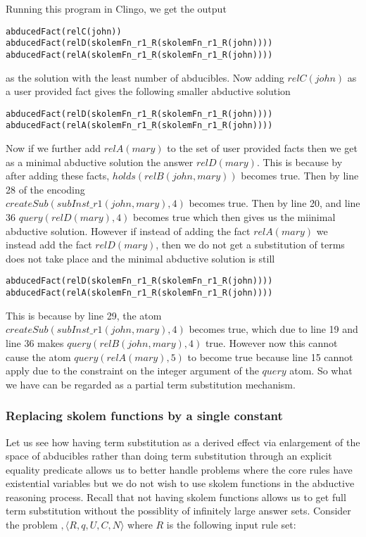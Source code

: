 Running this program in Clingo, we get the output 
\begin{lstlisting}[frame=none]
abducedFact(relC(john))
abducedFact(relD(skolemFn_r1_R(skolemFn_r1_R(john))))
abducedFact(relA(skolemFn_r1_R(skolemFn_r1_R(john))))    
\end{lstlisting}
as the solution with the least number of abducibles.
Now adding $relC(john)$ as a user provided fact gives the following smaller abductive solution
\begin{lstlisting}[frame=none]
abducedFact(relD(skolemFn_r1_R(skolemFn_r1_R(john))))
abducedFact(relA(skolemFn_r1_R(skolemFn_r1_R(john))))    
\end{lstlisting}
Now if we further add $relA(mary)$ to the set of user provided facts then we
get as a minimal abductive solution the answer $relD(mary)$. This is because
by after adding these facts, $holds(relB(john,mary))$ becomes true. Then by
line 28 of the encoding\\
$createSub(subInst\_r1(john,mary),4)$ becomes
true. Then by line 20, and line 36 $query(relD(mary),4)$ becomes true which
then gives us the miinimal abductive solution. However if instead of adding
the fact $relA(mary)$ we instead add the fact $relD(mary)$, then we do not get
a  substitution of terms does not take place and the minimal abductive
solution is still
\begin{lstlisting}[frame=none]
abducedFact(relD(skolemFn_r1_R(skolemFn_r1_R(john))))
abducedFact(relA(skolemFn_r1_R(skolemFn_r1_R(john))))    
\end{lstlisting} 
This is because by line 29, the atom\\ $createSub(subInst\_r1(john,mary),4)$ becomes true,
which due to line 19 and line 36 makes $query(relB(john,mary),4)$
true. However now this cannot cause the atom $query(relA(mary),5)$ to become
true because line 15 cannot apply due to the constraint on the integer
argument of the $query$ atom. So what we have can be regarded as a partial
term substitution mechanism.


\subsubsection{Replacing skolem functions by a single constant}

Let us see how having term substitution as a derived effect via enlargement of
the space of abducibles rather than doing term substitution through an
explicit equality predicate allows us to better handle problems where the core
rules have existential variables but we do not wish to use skolem functions in
the abductive reasoning process. Recall that not having skolem functions
allows us to get full term substitution without the possiblity of infinitely
large answer sets. Consider the problem $,\langle R,q,U,C,N \rangle$ where $R$ is the
following input rule set: 

